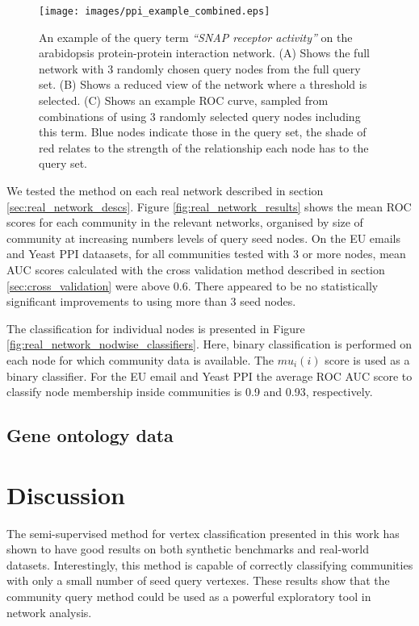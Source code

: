 \documentclass[manuscript, proceedings]{acmart}
\begin{document}
\begin{figure}[ht]
\texttt{[image: images/ppi\_example\_combined.eps]}
\caption{An example of the query term \textit{``SNAP receptor activity''} on the arabidopsis protein-protein interaction network.
(A) Shows the full network with 3 randomly chosen query nodes from the full query set.
(B) Shows a reduced view of the network where a threshold is selected.
(C) Shows an example ROC curve, sampled from combinations of using 3 randomly selected query nodes including this term.
Blue nodes indicate those in the query set, the shade of red relates to the strength of the relationship each node has to the query set.
}
\label{fig:query_example}
\end{figure}


We tested the method on each real network described in section \ref{sec:real_network_descs}.
Figure \ref{fig:real_network_results} shows the mean ROC scores for each community in the relevant networks, organised by size of community at increasing numbers levels of query seed nodes.
On the EU emails and Yeast PPI dataasets, for all communities tested with 3 or more nodes, mean AUC scores calculated with the cross validation method described in section \ref{sec:cross_validation} were above 0.6.
There appeared to be no statistically significant improvements to using more than 3 seed nodes.

The classification for individual nodes is presented in Figure \ref{fig:real_network_nodwise_classifiers}.
Here, binary classification is performed on each node for which community data is available.
The $mu_i({i})$ score is used as a binary classifier.
For the EU email and Yeast PPI the average ROC AUC score to classify node membership inside communities is 0.9 and 0.93, respectively.

\subsection{Gene ontology data}
\label{sec:go_labels}

\section{Discussion}
The semi-supervised method for vertex classification presented in this work has shown to have good results on both synthetic benchmarks and real-world datasets.
Interestingly, this method is capable of correctly classifying communities with only a small number of seed query vertexes.
These results show that the community query method could be used as a powerful exploratory tool in network analysis.
\end{document}
